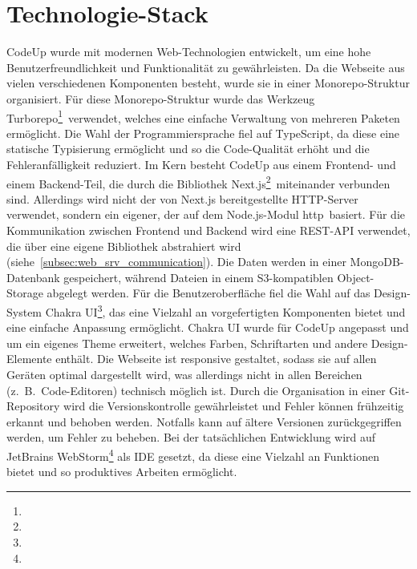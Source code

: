 \documentclass[main.tex]{subfiles}
\begin{document}
    \section{Technologie-Stack}
    CodeUp wurde mit modernen Web-Technologien entwickelt, um eine hohe Benutzerfreundlichkeit und Funktionalität zu gewährleisten.
    Da die Webseite aus vielen verschiedenen Komponenten besteht, wurde sie in einer Monorepo-Struktur organisiert.
    Für diese Monorepo-Struktur wurde das Werkzeug \dq Turborepo\dq\footnote{}\ verwendet, welches eine einfache Verwaltung von mehreren Paketen ermöglicht.
    Die Wahl der Programmiersprache fiel auf TypeScript, da diese eine statische Typisierung ermöglicht und so die Code-Qualität erhöht und die Fehleranfälligkeit reduziert.
    Im Kern besteht CodeUp aus einem Frontend- und einem Backend-Teil, die durch die Bibliothek \dq Next.js\dq\footnote{}\ miteinander verbunden sind.
    Allerdings wird nicht der von Next.js bereitgestellte HTTP-Server verwendet, sondern ein eigener, der auf dem Node.js-Modul \dq http\dq\ basiert.
    Für die Kommunikation zwischen Frontend und Backend wird eine REST-API verwendet, die über eine eigene Bibliothek abstrahiert wird (siehe~\ref{subsec:web_srv_communication}).
    Die Daten werden in einer MongoDB-Datenbank gespeichert, während Dateien in einem S3-kompatiblen Object-Storage abgelegt werden.
    Für die Benutzeroberfläche fiel die Wahl auf das Design-System \dq Chakra UI\dq\footnote{}, das eine Vielzahl an vorgefertigten Komponenten bietet und eine einfache Anpassung ermöglicht.
    Chakra UI wurde für CodeUp angepasst und um ein eigenes Theme erweitert, welches Farben, Schriftarten und andere Design-Elemente enthält.
    Die Webseite ist responsive gestaltet, sodass sie auf allen Geräten optimal dargestellt wird, was allerdings nicht in allen Bereichen (z.~B.~Code-Editoren) technisch möglich ist.
    Durch die Organisation in einer Git-Repository wird die Versionskontrolle gewährleistet und Fehler können frühzeitig erkannt und behoben werden.
    Notfalls kann auf ältere Versionen zurückgegriffen werden, um Fehler zu beheben.
    Bei der tatsächlichen Entwicklung wird auf JetBrains WebStorm\footnote{} als IDE gesetzt, da diese eine Vielzahl an Funktionen bietet und so produktives Arbeiten ermöglicht.
\end{document}

